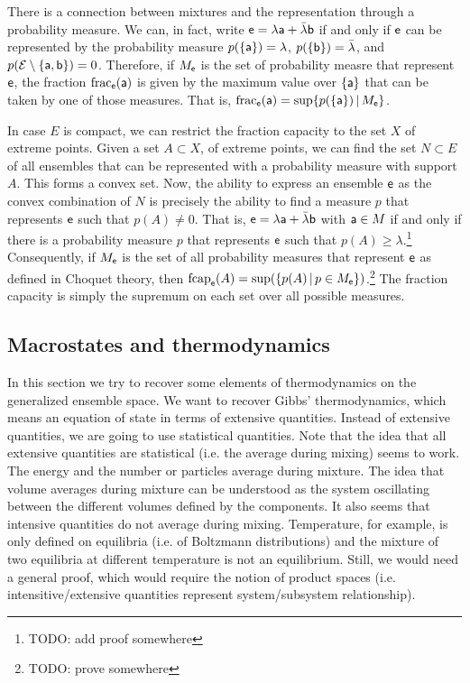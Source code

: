 There is a connection between mixtures and the representation through a probability measure. We can, in fact, write $\ens = \lambda \ens[a] + \bar{\lambda} \ens[b]$ if and only if $\ens$ can be represented by the probability measure $p(\{\ens[a]\}) = \lambda$, $p(\{\ens[b]\}) = \bar{\lambda}$, and $p(\Ens \setminus \{\ens[a], \ens[b]\}) = 0$. Therefore, if $M_{\ens}$ is the set of probability measre that represent $\ens$, the fraction $\size_{\ens}(\ens[a])$ is given by the maximum value over $\{\ens[a]\}$ that can be taken by one of those measures. That is,  $\size_{\ens}(\ens[a]) = \sup \{ p(\{\ens[a]\}) \, | \, M_{\ens} \}$.



In case $E$ is compact, we can restrict the fraction capacity to the set $X$ of extreme points. Given a set $A \subset X$, of extreme points, we can find the set $N \subset E$ of all ensembles that can be represented with a probability measure with support $A$. This forms a convex set. Now, the ability to express an ensemble $\ens$ as the convex combination of $N$ is precisely the ability to find a measure $p$ that represents $\ens$ such that $p(A) \neq 0$. That is, $\ens = \lambda \ens[a] + \bar{\lambda} \ens[b]$ with $\ens[a] \in M$ if and only if there is a probability measure $p$ that represents $\ens$ such that $p(A) \geq \lambda$.\footnote{TODO: add proof somewhere} Consequently, if $M_{\ens}$ is the set of all probability measures that represent $\ens$ as defined in Choquet theory, then $\fcap_{\ens}(A) = \sup(\{p(A) \, | \, p \in M_{\ens}\})$.\footnote{TODO: prove somewhere} The fraction capacity is simply the supremum on each set over all possible measures.

\subsection{Macrostates and thermodynamics}

In this section we try to recover some elements of thermodynamics on the generalized ensemble space. We want to recover Gibbs' thermodynamics, which means an equation of state in terms of extensive quantities. Instead of extensive quantities, we are going to use statistical quantities. Note that the idea that all extensive quantities are statistical (i.e. the average during mixing) seems to work. The energy and the number or particles average during mixture. The idea that volume averages during mixture can be understood as the system oscillating between the different volumes defined by the components. It also seems that intensive quantities do not average during mixing. Temperature, for example, is only defined on equilibria (i.e. of Boltzmann distributions) and the mixture of two equilibria at different temperature is not an equilibrium. Still, we would need a general proof, which would require the notion of product spaces (i.e. intensitive/extensive quantities represent system/subsystem relationship).

